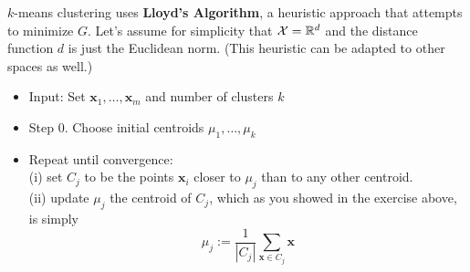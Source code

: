\documentclass[11pt]{article}
\newcommand{\R}{\ensuremath{\mathbb{R}}}
\newcommand{\V}[1]{\mathbf{#1}}
\begin{document}
$k$-means clustering uses {\bf Lloyd's Algorithm}, a heuristic approach that
attempts to 
minimize $G$. Let's assume for simplicity that $\X=\R^d$ and the distance
function $d$ is just the Euclidean norm. (This heuristic can be adapted to
other spaces as well.)
        \begin{itemize}
          \item Input: Set $\V{x}_1,\ldots,\V{x}_m$ and number of clusters $k$
          \item Step 0. Choose initial centroids $\mu_1,\ldots,\mu_k$
          \item Repeat until convergence: \\
            (i) set $C_j$ to be the points
            $\V{x}_i$ closer to $\mu_j$ than to any other centroid. \\(ii) update 
            $\mu_j$ the centroid of $C_j$, which as you showed in the exercise
            above, is simply 
            \[
              \mu_j := \frac{1}{|C_j|} \sum_{\V{x}\in C_j} \V{x}
            \]

        \end{itemize}
\end{document}
